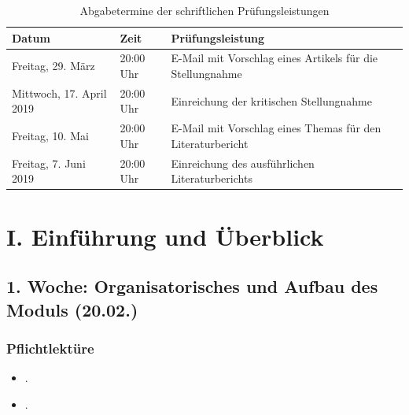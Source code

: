 \documentclass[abstract=on,parskip=full,headings=standardclasses,fontsize=11pt,paper=a4]{scrartcl}
\begin{document}
\begin{table}[h] \centering \onehalfspacing \small
\caption*{Abgabetermine der schriftlichen Prüfungsleistungen}
\begin{tabular}{ l l l} 
\toprule
Datum &  Zeit & Prüfungsleistung \\
\midrule
Freitag, 29. März  & 20:00 Uhr &  E-Mail mit Vorschlag eines Artikels für die Stellungnahme  \\
Mittwoch, 17. April 2019 & 20:00 Uhr & Einreichung der kritischen Stellungnahme  \\
Freitag, 10. Mai  & 20:00 Uhr & E-Mail mit Vorschlag eines Themas für den Literaturbericht \\
Freitag, 7. Juni 2019 & 20:00 Uhr & Einreichung des ausführlichen Literaturberichts  \\
\bottomrule
\end{tabular}
\end{table}



\tableofcontents

\section{I. Einführung und Überblick}


\subsection{1. Woche: Organisatorisches und Aufbau des Moduls (20.02.)}



\subsubsection*{Pflichtlektüre}
\begin{itemize}
\item {}.
\item {}.
\end{itemize}
\end{document}
